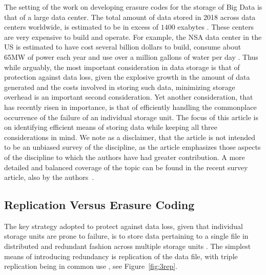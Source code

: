 \begin{multicols}{2}
The setting of the work on developing erasure codes for the storage of Big Data is that of a large data center.  The total amount of data stored in 2018 across data centers worldwide, is estimated to be in excess of $1400$ exabytes \cite{datacenterstorage}.   These centers are very expensive to build and operate.  For example, the NSA data center in the US is estimated to have cost several billion dollars to build, consume about 65MW of power each year and use over a million gallons of water per day \cite{utahestimate}.  Thus while arguably, the most important consideration in data storage is that of protection against data loss, given the explosive growth in the amount of data generated and the costs involved in storing such data, minimizing storage overhead is an important second consideration.  Yet another consideration, that has recently risen in importance, is that of efficiently handling the commonplace occurrence of the failure of an individual storage unit. The focus of this article is on identifying efficient means of storing data while keeping all three considerations in mind.  We note as a disclaimer, that the article is not intended to be an unbiased survey of the discipline, as the article emphasizes those aspects of the discipline to which the authors have had greater contribution. 	A more detailed and balanced coverage of the topic can be found in the recent survey article, also by the authors~\cite{ScienceChinaBalajiKVRSK18}. %
	
\subsection{Replication Versus Erasure Coding} 
	
The key strategy adopted to protect against data loss, given that individual storage units are prone to failure, is to store data pertaining to a single file in distributed and redundant fashion across multiple storage units \cite{ScienceChinaBalajiKVRSK18}.   The simplest means of introducing redundancy is replication of the data file, with triple replication being in common use \cite{hadoop}, see Figure~\ref{fig:3rep}.  


\end{multicols}
